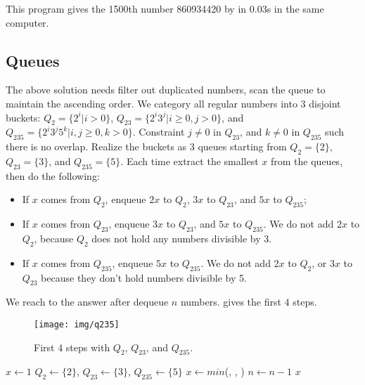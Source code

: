 \documentclass[b5paper]{article}
\begin{document}
This program gives the 1500th number 860934420 by  in 0.03s in the same computer.

\subsection*{Queues}
The above solution needs filter out duplicated numbers, scan the queue to maintain the ascending order. We category all regular numbers into 3 disjoint buckets: $Q_2 = \{2^i | i > 0\}$, $Q_{23} = \{ 2^i3^j | i \geq 0, j > 0 \}$, and $Q_{235} = \{ 2^i3^j5^k | i,j \geq 0, k > 0\}$. Constraint $j \neq 0$ in $Q_{23}$, and $k \neq 0$ in $Q_{235}$ such there is no overlap. Realize the buckets as 3 queues starting from $Q_2 = \{ 2 \}$, $Q_{23} = \{ 3\}$, and $Q_{235} = \{ 5 \}$. Each time extract the smallest $x$ from the queues, then do the following:

\begin{itemize}
\item If $x$ comes from $Q_2$, enqueue $2x$ to $Q_2$, $3x$ to $Q_{23}$, and $5x$ to $Q_{235}$;
\item If $x$ comes from $Q_{23}$, enqueue $3x$ to $Q_{23}$, and $5x$ to $Q_{235}$. We do not add $2x$ to $Q_2$, because $Q_2$ does not hold any numbers divisible by 3.
\item If $x$ comes from $Q_{235}$, enqueue $5x$ to $Q_{235}$. We do not add $2x$ to $Q_2$, or $3x$ to $Q_{23}$ because they don't hold numbers divisible by 5.
\end{itemize}

We reach to the answer after dequeue $n$ numbers.  gives the first 4 steps.

\begin{figure}[htbp]
  \centering
  \texttt{[image: img/q235]}
  \caption{First 4 steps with $Q_2$, $Q_{23}$, and $Q_{235}$.}
  \label{fig:q235}
\end{figure}

\begin{algorithmic}[1]
  \State $x \gets 1$
  \State $Q_2 \gets \{ 2 \}$, $Q_{23} \gets \{ 3 \}$, $Q_{235} \gets \{ 5 \}$
    \State $x \gets min$(, , )
      \State {}
      \State {}
      \State {}
      \State {}
      \State {}
      \State {}
      \State {}
    \Else
      \State {}
      \State {}
    \EndIf
    \State $n \gets n - 1$
  \EndWhile
  \State \Return $x$
\EndFunction
\end{algorithmic}
\end{document}
